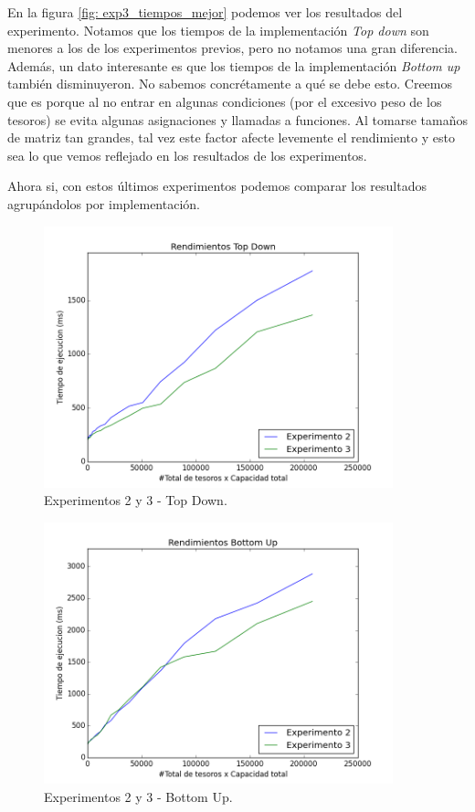 \par En la figura \ref{fig: exp3_tiempos_mejor} podemos ver los resultados del experimento. Notamos que los tiempos de la implementación \textit{Top down} son menores a los de los experimentos previos, pero no notamos una gran diferencia. Además, un dato interesante es que los tiempos de la implementación \textit{Bottom up} también disminuyeron. No sabemos concrétamente a qué se debe esto. Creemos que es porque al no entrar en algunas condiciones (por el excesivo peso de los tesoros) se evita algunas asignaciones y llamadas a funciones. Al tomarse tamaños de matriz tan grandes, tal vez este factor afecte levemente el rendimiento y esto sea lo que vemos reflejado en los resultados de los experimentos.

\par Ahora si, con estos últimos experimentos podemos comparar los resultados agrupándolos por implementación.

\begin{figure}[H]
	\centering
	\includegraphics[width=0.9\textwidth]{Problema3/img/comparacion_td.png}
	\caption{Experimentos 2 y 3 - Top Down.}
	\label{fig: comparacion_td}
\end{figure}

\begin{figure}[H]
	\centering
	\includegraphics[width=0.9\textwidth]{Problema3/img/comparacion_bu.png}
	\caption{Experimentos 2 y 3 - Bottom Up.}
	\label{fig: comparacion_bu}
\end{figure}

